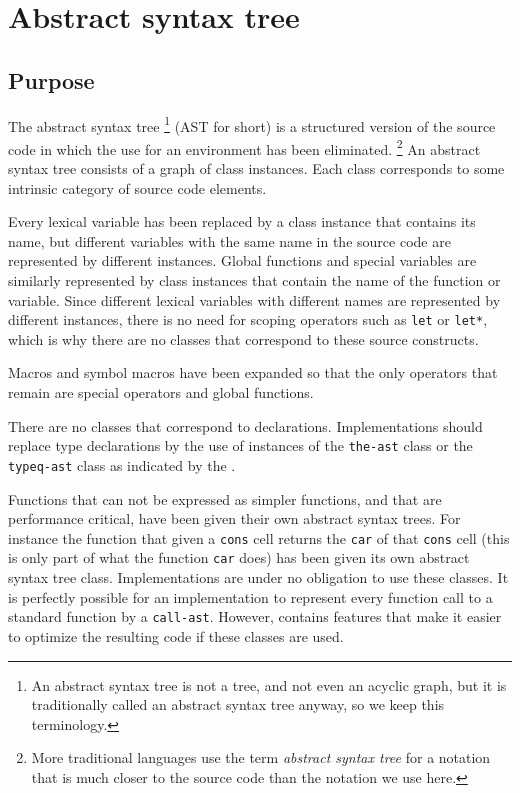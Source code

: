 \chapter{Abstract syntax tree}
\label{chap-abstract-syntax-tree}

\section{Purpose}

The abstract syntax tree%
\footnote{An abstract syntax tree is not a tree, and not even an
  acyclic graph, but it is traditionally called an abstract syntax
  tree anyway, so we keep this terminology.}  (AST for short) is a
structured version of the source code in which the use for an
environment has been eliminated.%
\footnote{More traditional languages use the term \emph{abstract
    syntax tree} for a notation that is much closer to the source code
  than the notation we use here.}
An abstract syntax tree consists of
a graph of class instances.  Each class corresponds to some intrinsic
category of source code elements.

Every lexical variable has been replaced by a class instance that
contains its name, but different variables with the same name in the
source code are represented by different instances.  Global functions
and special variables are similarly represented by class instances
that contain the name of the function or variable.  Since different
lexical variables with different names are represented by different
instances, there is no need for scoping operators such as
\texttt{let} or \texttt{let*}, which is why there are no classes that
correspond to these source constructs.  

Macros and symbol macros have been expanded so that the only operators
that remain are special operators and global functions.  

There are no classes that correspond to declarations.  Implementations
should replace type declarations by the use of instances of the
\texttt{the-ast} class or the \texttt{typeq-ast} class as indicated by
the \hs{}.

Functions that can not be expressed as simpler functions, and that are
performance critical, have been given their own abstract syntax trees.
For instance the function that given a \texttt{cons} cell returns the
\texttt{car} of that \texttt{cons} cell (this is only part of what the
\commonlisp{} function \texttt{car} does) has been given its own abstract
syntax tree class.  Implementations are under no obligation to use
these classes.  It is perfectly possible for an implementation to
represent every function call to a standard \commonlisp{} function by a
\texttt{call-ast}.  However, \sysname{} contains features that make it
easier to optimize the resulting code if these classes are used.

